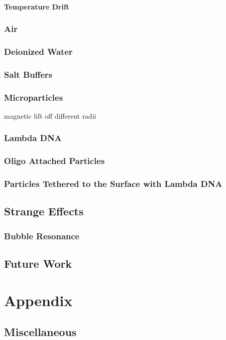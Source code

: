 \documentclass[a4paper,titlepage,onecolumn]{report}
\begin{document}
\subsection{Temperature Drift}
\section{Air}
\section{Deionized Water}
\section{Salt Buffers}
\section{Microparticles}
magnetic lift off
different radii
\section{Lambda DNA}
\section{Oligo Attached Particles}
\section{Particles Tethered to the Surface with Lambda DNA}

\chapter{Strange Effects}
\section{Bubble Resonance}

\chapter{Future Work}

\part{Appendix}
\appendix

\chapter{Miscellaneous}
\end{document}
